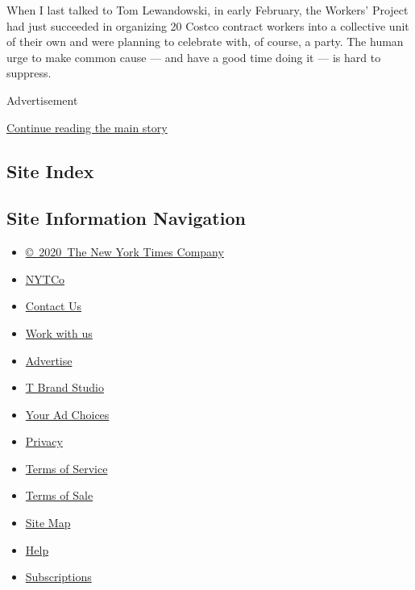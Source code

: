 When I last talked to Tom Lewandowski, in early February, the Workers'
Project had just succeeded in organizing 20 Costco contract workers into
a collective unit of their own and were planning to celebrate with, of
course, a party. The human urge to make common cause --- and have a good
time doing it --- is hard to suppress.

Advertisement

\protect\hyperlink{after-bottom}{Continue reading the main story}

\hypertarget{site-index}{%
\subsection{Site Index}\label{site-index}}

\hypertarget{site-information-navigation}{%
\subsection{Site Information
Navigation}\label{site-information-navigation}}

\begin{itemize}
\tightlist
\item
  \href{https://help.nytimes3xbfgragh.onion/hc/en-us/articles/115014792127-Copyright-notice}{©~2020~The
  New York Times Company}
\end{itemize}

\begin{itemize}
\tightlist
\item
  \href{https://www.nytco.com/}{NYTCo}
\item
  \href{https://help.nytimes3xbfgragh.onion/hc/en-us/articles/115015385887-Contact-Us}{Contact
  Us}
\item
  \href{https://www.nytco.com/careers/}{Work with us}
\item
  \href{https://nytmediakit.com/}{Advertise}
\item
  \href{http://www.tbrandstudio.com/}{T Brand Studio}
\item
  \href{https://www.nytimes3xbfgragh.onion/privacy/cookie-policy\#how-do-i-manage-trackers}{Your
  Ad Choices}
\item
  \href{https://www.nytimes3xbfgragh.onion/privacy}{Privacy}
\item
  \href{https://help.nytimes3xbfgragh.onion/hc/en-us/articles/115014893428-Terms-of-service}{Terms
  of Service}
\item
  \href{https://help.nytimes3xbfgragh.onion/hc/en-us/articles/115014893968-Terms-of-sale}{Terms
  of Sale}
\item
  \href{https://spiderbites.nytimes3xbfgragh.onion}{Site Map}
\item
  \href{https://help.nytimes3xbfgragh.onion/hc/en-us}{Help}
\item
  \href{https://www.nytimes3xbfgragh.onion/subscription?campaignId=37WXW}{Subscriptions}
\end{itemize}
